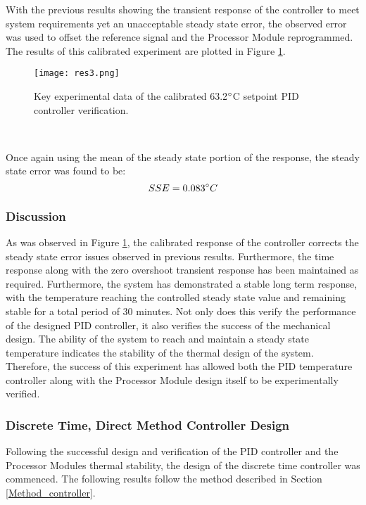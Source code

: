 With the previous results showing the transient response of the controller to meet system requirements yet an unacceptable steady state error, the observed error was used to offset the reference signal and the Processor Module reprogrammed. The results of this calibrated experiment are plotted in Figure \ref{fig:res3}. 

\begin{figure}[!htb]
	\centering
	\texttt{[image: res3.png]}
	\caption[Temperature Sensor Data Key Values - calibrated 63.2$\degree$C Setpoint.]{Key experimental data of the calibrated 63.2$\degree$C setpoint PID controller verification.}
	\label{fig:res3}
\end{figure} 
\FloatBarrier

Once again using the mean of the steady state portion of the response, the steady state error was found to be: 
$$ SSE = 0.083\degree C$$

\subsubsection{Discussion}

As was observed in Figure \ref{fig:res3}, the calibrated response of the controller corrects the steady state error issues observed in previous results. Furthermore, the time response along with the zero overshoot transient response has been maintained as required. Furthermore, the system has demonstrated a stable long term response, with the temperature reaching the controlled steady state value and remaining stable for a total period of 30 minutes. Not only does this verify the performance of the designed PID controller, it also verifies the success of the mechanical design. The ability of the system to reach and maintain a steady state temperature indicates the stability of the thermal design of the system. Therefore, the success of this experiment has allowed both the PID temperature controller along with the Processor Module design itself to be experimentally verified.

\subsubsection{Discrete Time, Direct Method Controller Design}

Following the successful design and verification of the PID controller and the Processor Modules thermal stability, the design of the discrete time controller was commenced. The following results follow the method described in Section \ref{Method_controller}.\\

